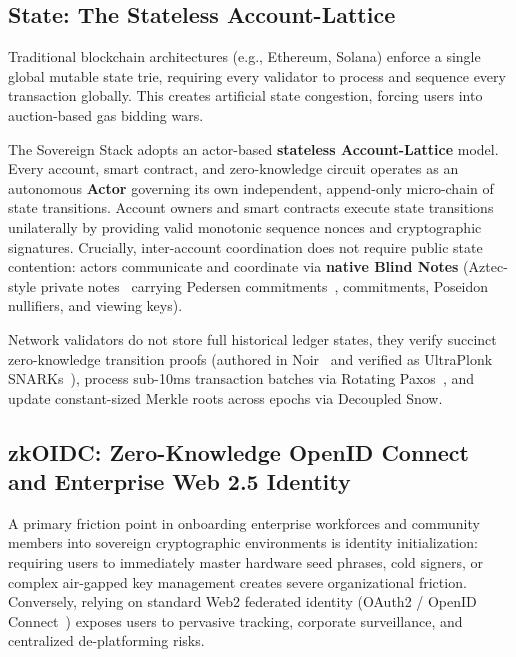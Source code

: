 \documentclass[a4paper,11pt,twoside,parskip=half-,headings=small]{scrartcl}
\begin{document}
\subsection{State: The Stateless Account-Lattice}

Traditional blockchain architectures (e.g., Ethereum, Solana) enforce a single global
mutable state trie, requiring every validator to process and sequence every transaction
globally. This creates artificial state congestion, forcing users into auction-based gas
bidding wars.

The Sovereign Stack adopts an actor-based \textbf{stateless Account-Lattice} model. Every account,
smart contract, and zero-knowledge circuit operates as an autonomous \textbf{Actor} governing
its own independent, append-only micro-chain of state transitions. Account owners and smart contracts
execute state transitions unilaterally by providing valid monotonic sequence nonces and
cryptographic signatures. Crucially, inter-account coordination does not require public state contention:
actors communicate and coordinate via \textbf{native Blind Notes} (Aztec-style private notes~\cite{williamson2022aztec} carrying Pedersen commitments~\cite{pedersen1991commitment},
commitments, Poseidon nullifiers, and viewing keys).

Network validators do not store full historical ledger states, they verify succinct zero-knowledge
transition proofs (authored in Noir~\cite{aztec2021noir} and verified as UltraPlonk SNARKs~\cite{gabizon2019plonk}), process sub-10ms transaction batches via Rotating Paxos~\cite{lamport1998paxos,lamport2001paxos}, and update constant-sized Merkle
roots across epochs via Decoupled Snow.

\subsection{zkOIDC: Zero-Knowledge OpenID Connect and Enterprise Web 2.5 Identity}
\label{sec:zkoidc}

A primary friction point in onboarding enterprise workforces and community members into sovereign cryptographic environments is identity initialization: requiring users to immediately master hardware seed phrases, cold signers, or complex air-gapped key management creates severe organizational friction. Conversely, relying on standard Web2 federated identity (OAuth2 / OpenID Connect~\cite{oidc2014}) exposes users to pervasive tracking, corporate surveillance, and centralized de-platforming risks.
\end{document}
